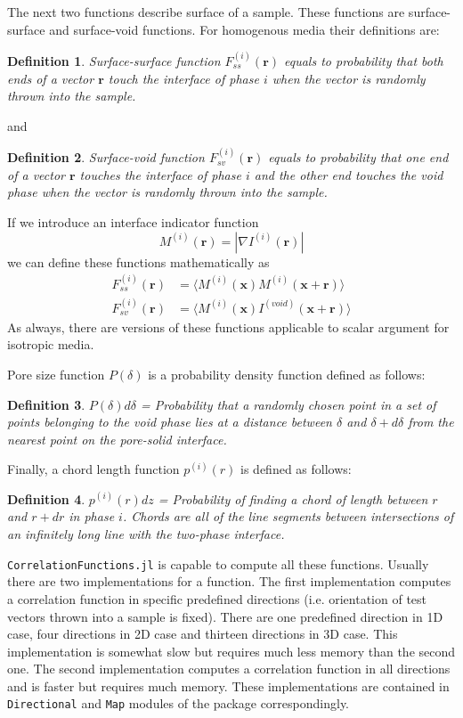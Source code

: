 \documentclass[reprint,amsmath,amssymb,aps,pre,showkeys,showpacs,nofootinbib]{revtex4-1}
\newtheorem{definition}{Definition}
\newcommand{\code}[1]{\colorbox{light-gray}{\texttt{#1}}}
\begin{document}
The next two functions describe surface of a sample. These functions are
surface-surface and surface-void functions. For homogenous media their
definitions are:
\begin{definition}
  Surface-surface function $F_{ss}^{(i)}(\bm{r})$ equals to probability that
  both ends of a vector $\bm{r}$ touch the interface of phase $i$ when the
  vector is randomly thrown into the sample.
\end{definition}
and
\begin{definition}
  Surface-void function $F_{sv}^{(i)}(\bm{r})$ equals to probability that
  one end of a vector $\bm{r}$ touches the interface of phase $i$ and the
  other end touches the void phase when the vector is randomly thrown into the
  sample.
\end{definition}
If we introduce an interface indicator function
\begin{equation*}
  M^{(i)}(\bm{r}) = | \nabla I^{(i)}(\bm{r}) |
\end{equation*}
we can define these functions mathematically as
\begin{align}
  F_{ss}^{(i)}(\bm{r}) &= \langle M^{(i)}(\bm{x}) M^{(i)}(\bm{x} +
  \bm{r}) \rangle \label{eq:fss-def} \\
  F_{sv}^{(i)}(\bm{r}) &= \langle M^{(i)}(\bm{x}) I^{(void)}(\bm{x}
  + \bm{r}) \rangle \label{eq:fsv-def}
\end{align}
As always, there are versions of these functions applicable to scalar argument
for isotropic media.

Pore size function $P(\delta)$ is a probability density function defined as
follows:
\begin{definition}
  $P(\delta)d\delta$ = Probability that a randomly chosen point in a set of points
  belonging to the void phase lies at a distance between $\delta$ and $\delta + d\delta$
  from the nearest point on the pore-solid interface.
\end{definition}

Finally, a chord length function $p^{(i)}(r)$ is defined as follows:
\begin{definition}
$p^{(i)}(r)dz$ = Probability of finding a chord of length between $r$ and $r+dr$
in phase $i$. Chords are all of the line segments between intersections of an
infinitely long line with the two-phase interface.
\end{definition}

\verb+CorrelationFunctions.jl+ is capable to compute all these
functions. Usually there are two implementations for a function. The first
implementation computes a correlation function in specific predefined directions
(i.e. orientation of test vectors thrown into a sample is fixed). There are one
predefined direction in 1D case, four directions in 2D case and thirteen
directions in 3D case. This implementation is somewhat slow but requires much
less memory than the second one. The second implementation computes a
correlation function in all directions and is faster but requires much memory.
These implementations are contained in \code{Directional} and \code{Map} modules
of the package correspondingly.
\end{document}
